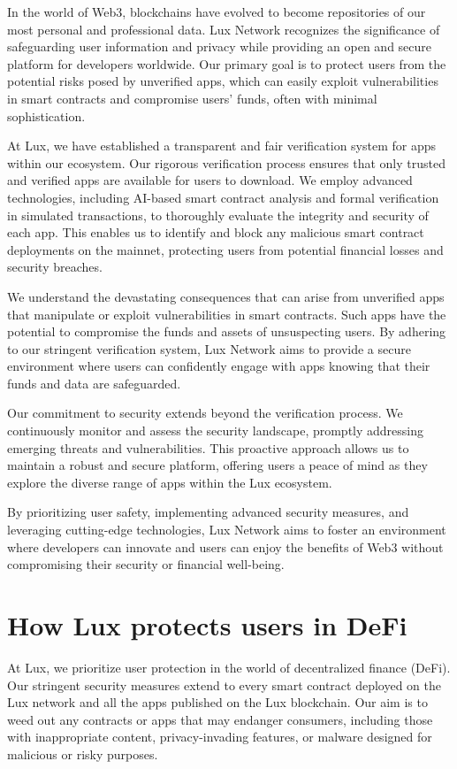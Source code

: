 \documentclass[11pt]{article}
\begin{document}
In the world of Web3, blockchains have evolved to become repositories of our most personal and professional data. Lux Network recognizes the significance of safeguarding user information and privacy while providing an open and secure platform for developers worldwide. Our primary goal is to protect users from the potential risks posed by unverified apps, which can easily exploit vulnerabilities in smart contracts and compromise users' funds, often with minimal sophistication.


At Lux, we have established a transparent and fair verification system for apps within our ecosystem. Our rigorous verification process ensures that only trusted and verified apps are available for users to download. We employ advanced technologies, including AI-based smart contract analysis and formal verification in simulated transactions, to thoroughly evaluate the integrity and security of each app. This enables us to identify and block any malicious smart contract deployments on the mainnet, protecting users from potential financial losses and security breaches.


We understand the devastating consequences that can arise from unverified apps that manipulate or exploit vulnerabilities in smart contracts. Such apps have the potential to compromise the funds and assets of unsuspecting users. By adhering to our stringent verification system, Lux Network aims to provide a secure environment where users can confidently engage with apps knowing that their funds and data are safeguarded.


Our commitment to security extends beyond the verification process. We continuously monitor and assess the security landscape, promptly addressing emerging threats and vulnerabilities. This proactive approach allows us to maintain a robust and secure platform, offering users a peace of mind as they explore the diverse range of apps within the Lux ecosystem.


By prioritizing user safety, implementing advanced security measures, and leveraging cutting-edge technologies, Lux Network aims to foster an environment where developers can innovate and users can enjoy the benefits of Web3 without compromising their security or financial well-being.


\section{How Lux protects users in DeFi}

At Lux, we prioritize user protection in the world of decentralized finance (DeFi). Our stringent security measures extend to every smart contract deployed on the Lux network and all the apps published on the Lux blockchain. Our aim is to weed out any contracts or apps that may endanger consumers, including those with inappropriate content, privacy-invading features, or malware designed for malicious or risky purposes.
\end{document}

